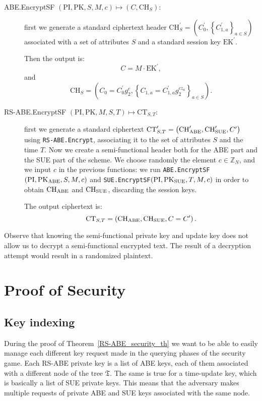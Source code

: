 \documentclass[a4paper,10pt]{article}
\newcommand{\Z}{\mathbb{Z}}
\newcommand{\tree}{\mathfrak{T}}
\newcommand{\maps}[2]{$ \left( #1 \right) \mapsto \left( #2 \right) $}
\newcommand{\mapssingleoutput}[2]{$ \left( #1 \right) \mapsto #2 $}
\newcommand{\algorithm}[2]{\texttt{#1.#2}}
\newcommand{\algorithmdef}[4]{\item[#1.#2 \maps{#3}{#4}:]}
\newcommand{\algorithmdefsingleoutput}[4]{\item[#1.#2 \mapssingleoutput{#3}{#4}:] }
\begin{document}
\begin{description}
\algorithmdef{ABE}{EncryptSF}{\mathrm{PI},\mathrm{PK},S,M,c}{C,\mathrm{CH}_{S}} first we generate a standard ciphertext header $\mathrm{CH}^\prime_{S}=\left(C^\prime_0,\left\{C^\prime_{1,a}\right\}_{a\in S} \right)$ associated with a set of attributes $S$ and a standard session key $\mathrm{EK}^\prime$.
	
	Then the output is: \[C=M\cdot\mathrm{EK}^\prime,\] and \[\mathrm{CH}_{S}=\left(C_0=C^\prime_0 g_2^c,\left\{C_{1,a}=C^\prime_{1,a} g_2^{cz_a} \right\}_{a\in S} \right).\]
	
	
	\algorithmdefsingleoutput{RS-ABE}{EncryptSF}{\mathrm{PI},\mathrm{PK},M,S,T}{\mathrm{CT}_{S,T}} first we generate a standard ciphertext $\mathrm{CT}^{\prime}_{S,T}=\left( \mathrm{CH}^\prime_{\textnormal{ABE}},\mathrm{CH}^\prime_{\textnormal{SUE}},C^\prime \right)$ using \algorithm{RS-ABE}{Encrypt}, associating it to the set of attributes $S$ and the time $T$.
	Now we create a semi-functional header both for the ABE part and the SUE part of the scheme.
	We choose randomly the element $c\in \Z_N$, and	
	we input $c$ in the previous functions: we run \algorithm{ABE}{EncryptSF}$(\mathrm{PI},\mathrm{PK}_{\textnormal{ABE}},S,M,c)$ and \algorithm{SUE}{EncryptSF}$(\mathrm{PI},\mathrm{PK}_{\textnormal{SUE}},T,M,c)$ in order to obtain $\mathrm{CH}_{\textnormal{ABE}}$ and $\mathrm{CH}_{\textnormal{SUE}}$, discarding the session keys.
	
	The output ciphertext is:
	\[
		\mathrm{CT}_{S,T}=\left( \mathrm{CH}_{\textnormal{ABE}},\mathrm{CH}_{\textnormal{SUE}},C=C^\prime \right).
	\]
	
	\end{description}
	


	Observe that knowing the semi-functional private key and update key does not allow us to decrypt a semi-functional encrypted text. The result of a decryption attempt would result in a randomized plaintext.

	\section{Proof of Security}\label{sec:proof}
	\subsection{Key indexing}
	During the proof of Theorem~\ref{RS-ABE_security_th} we want to be able to easily manage each different key request made in the querying phases of the security game.
	Each RS-ABE private key is a list of ABE keys, each of them associated with a different node of the tree $\tree$. The same is true for a time-update key, which is basically a list of SUE private keys.
	This means that the adversary makes multiple requests of private ABE and SUE keys associated with the same node.
	
\end{document}
